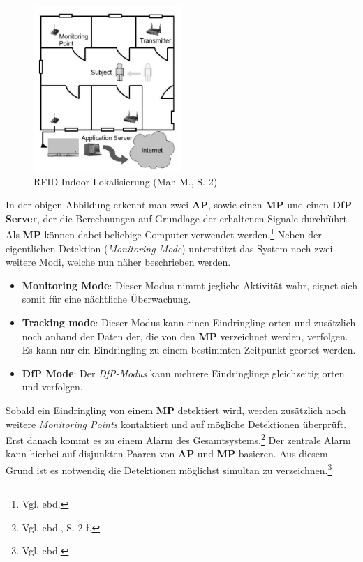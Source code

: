 \begin{figure}[H]
	\centering
	\includegraphics[width=0.5\textwidth]{pictures/rfid}
	\caption{RFID Indoor-Lokalisierung (Mah M., S. 2)}
\end{figure}

In der obigen Abbildung erkennt man zwei \textbf{AP}, sowie einen \textbf{MP} und einen \textbf{DfP Server}, der die Berechnungen auf Grundlage der erhaltenen Signale durchführt. Als \textbf{MP} können dabei beliebige Computer verwendet werden.\footnote{Vgl. ebd.} Neben der eigentlichen Detektion (\textit{Monitoring Mode}) unterstützt das System noch zwei weitere Modi, welche nun näher beschrieben werden.\\

\begin{itemize}
\item \textbf{Monitoring Mode}: Dieser Modus nimmt jegliche Aktivität wahr, eignet sich somit für eine nächtliche Überwachung.
\item \textbf{Tracking mode}: Dieser Modus kann einen Eindringling orten und zusätzlich noch anhand der Daten der, die von den \textbf{MP} verzeichnet werden, verfolgen. Es kann nur ein Eindringling zu einem bestimmten Zeitpunkt geortet werden.
\item \textbf{DfP Mode}: Der \textit{DfP-Modus} kann mehrere Eindringlinge gleichzeitig orten und verfolgen.
\end{itemize}

Sobald ein Eindringling von einem \textbf{MP} detektiert wird, werden zusätzlich noch weitere \textit{Monitoring Points} kontaktiert und auf mögliche Detektionen überprüft. Erst danach kommt es zu einem Alarm des Gesamtsystems.\footnote{Vgl. ebd., S. 2 f.} Der zentrale Alarm kann hierbei auf disjunkten Paaren von \textbf{AP} und \textbf{MP} basieren. Aus diesem Grund ist es notwendig die Detektionen möglichst simultan zu verzeichnen.\footnote{Vgl. ebd.}

